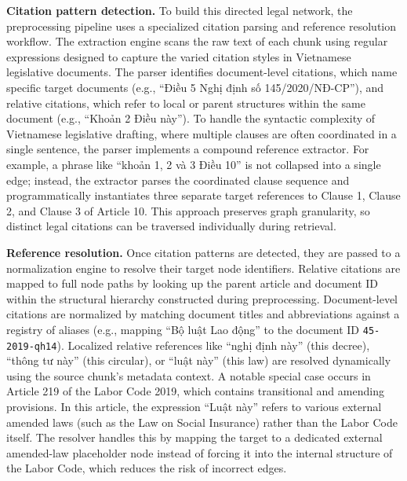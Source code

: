 \textbf{Citation pattern detection.} To build this directed legal network, the preprocessing pipeline uses a specialized citation parsing and reference resolution workflow. The extraction engine scans the raw text of each chunk using regular expressions designed to capture the varied citation styles in Vietnamese legislative documents. The parser identifies document-level citations, which name specific target documents (e.g., ``Điều 5 Nghị định số 145/2020/NĐ-CP''), and relative citations, which refer to local or parent structures within the same document (e.g., ``Khoản 2 Điều này''). To handle the syntactic complexity of Vietnamese legislative drafting, where multiple clauses are often coordinated in a single sentence, the parser implements a compound reference extractor. For example, a phrase like ``khoản 1, 2 và 3 Điều 10'' is not collapsed into a single edge; instead, the extractor parses the coordinated clause sequence and programmatically instantiates three separate target references to Clause 1, Clause 2, and Clause 3 of Article 10. This approach preserves graph granularity, so distinct legal citations can be traversed individually during retrieval.

\textbf{Reference resolution.} Once citation patterns are detected, they are passed to a normalization engine to resolve their target node identifiers. Relative citations are mapped to full node paths by looking up the parent article and document ID within the structural hierarchy constructed during preprocessing. Document-level citations are normalized by matching document titles and abbreviations against a registry of aliases (e.g., mapping ``Bộ luật Lao động'' to the document ID \texttt{45-2019-qh14}). Localized relative references like ``nghị định này'' (this decree), ``thông tư này'' (this circular), or ``luật này'' (this law) are resolved dynamically using the source chunk's metadata context. A notable special case occurs in Article 219 of the Labor Code 2019, which contains transitional and amending provisions. In this article, the expression ``Luật này'' refers to various external amended laws (such as the Law on Social Insurance) rather than the Labor Code itself. The resolver handles this by mapping the target to a dedicated external amended-law placeholder node instead of forcing it into the internal structure of the Labor Code, which reduces the risk of incorrect edges.

